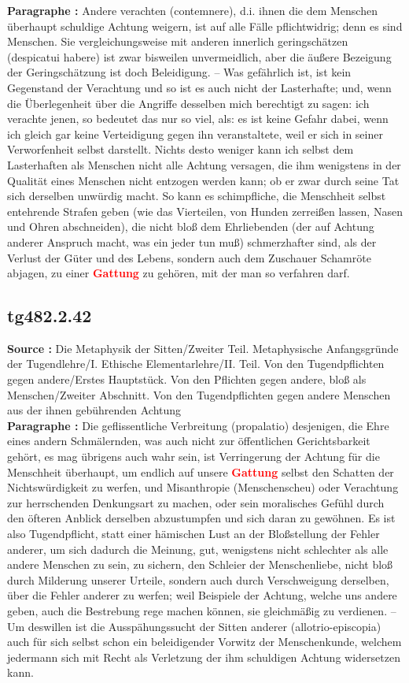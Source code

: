 \documentclass[a4paper,12pt,twoside]{book}
\newcommand{\match}[1]{\textcolor{red}{\textbf{#1}}}
\begin{document}
	\textbf{Paragraphe : }Andere verachten (contemnere), d.i. ihnen die dem Menschen überhaupt schuldige Achtung weigern, ist auf alle Fälle pflichtwidrig; denn es sind Menschen. Sie vergleichungsweise mit anderen innerlich geringschätzen (despicatui habere) ist zwar bisweilen unvermeidlich, aber die äußere Bezeigung der Geringschätzung ist doch Beleidigung. – Was gefährlich ist, ist kein Gegenstand der Verachtung und so ist es auch nicht der Lasterhafte; und, wenn die Überlegenheit über die Angriffe desselben mich berechtigt zu sagen: ich verachte jenen, so bedeutet das nur so viel, als: es ist keine Gefahr dabei, wenn ich gleich gar keine Verteidigung gegen ihn veranstaltete, weil er sich in seiner Verworfenheit selbst darstellt. Nichts desto weniger kann ich selbst dem Lasterhaften als Menschen nicht alle Achtung versagen, die ihm wenigstens in der Qualität eines Menschen nicht entzogen werden kann; ob er zwar durch seine Tat sich derselben unwürdig macht. So kann es schimpfliche, die Menschheit selbst entehrende Strafen geben (wie das Vierteilen, von Hunden zerreißen lassen, Nasen und Ohren abschneiden), die nicht bloß dem Ehrliebenden (der auf Achtung anderer Anspruch macht, was ein jeder tun muß) schmerzhafter sind, als der Verlust der Güter und des Lebens, sondern auch dem Zuschauer Schamröte abjagen, zu einer \match{Gattung} zu gehören, mit der man so verfahren darf. 
	
	\subsection*{tg482.2.42} 
	\textbf{Source : }Die Metaphysik der Sitten/Zweiter Teil. Metaphysische Anfangsgründe der Tugendlehre/I. Ethische Elementarlehre/II. Teil. Von den Tugendpflichten gegen andere/Erstes Hauptstück. Von den Pflichten gegen andere, bloß als Menschen/Zweiter Abschnitt. Von den Tugendpflichten gegen andere Menschen aus der ihnen gebührenden Achtung\\  
	
	\textbf{Paragraphe : }Die geflissentliche Verbreitung (propalatio) desjenigen, die Ehre eines andern Schmälernden, was auch nicht zur öffentlichen Gerichtsbarkeit gehört, es mag übrigens auch wahr sein, ist Verringerung der Achtung für die Menschheit überhaupt, um endlich auf unsere \match{Gattung} selbst den Schatten der Nichtswürdigkeit zu werfen, und Misanthropie (Menschenscheu) oder Verachtung zur herrschenden Denkungsart zu machen, oder sein moralisches Gefühl durch den öfteren Anblick derselben abzustumpfen und sich daran zu gewöhnen. Es ist also Tugendpflicht, statt einer hämischen Lust an der Bloßstellung der Fehler anderer, um sich dadurch die Meinung, gut, wenigstens nicht schlechter als alle andere Menschen zu sein, zu sichern, den Schleier der Menschenliebe, nicht bloß durch Milderung unserer Urteile, sondern auch durch Verschweigung derselben, über die Fehler anderer zu werfen; weil Beispiele der Achtung, welche uns andere geben, auch die Bestrebung rege machen können, sie gleichmäßig zu verdienen. – Um deswillen ist die Ausspähungssucht der Sitten anderer (allotrio-episcopia) auch für sich selbst schon ein beleidigender Vorwitz der Menschenkunde, welchem jedermann sich mit Recht als Verletzung der ihm schuldigen Achtung widersetzen kann. 
	
\end{document}
